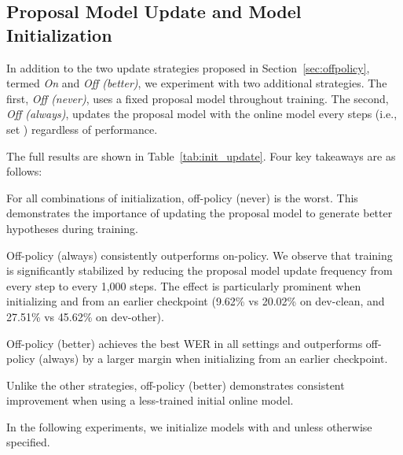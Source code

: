 \subsection{Proposal Model Update and Model Initialization}\label{sec:res_init_prop}

In addition to the two update strategies proposed in Section~\ref{sec:offpolicy}, termed \emph{On} and \emph{Off (better)}, we experiment with two additional strategies.
The first, \emph{Off (never)}, uses a fixed proposal model throughout training.
The second, \emph{Off (always)}, updates the proposal model with the online model every  steps (i.e., set ) regardless of performance.

The full results are shown in Table~\ref{tab:init_update}. 
Four key takeaways are as follows:
\begin{enumerate*}[label=(\arabic*)]
    \item For all combinations of  initialization, off-policy (never) is the worst. This demonstrates the importance of updating the proposal model to generate better hypotheses during training.
    
    \item Off-policy (always) consistently outperforms on-policy. We observe that training is significantly stabilized by reducing the proposal model update frequency from every step to every 1,000 steps.
    The effect is particularly prominent when initializing  and  from an earlier checkpoint (9.62\% vs 20.02\% on dev-clean, and 27.51\% vs 45.62\% on dev-other).
    
    \item Off-policy (better) achieves the best WER in all settings and outperforms off-policy (always) by a larger margin when initializing from an earlier checkpoint.
    
    \item Unlike the other strategies, off-policy (better) demonstrates consistent improvement when using a less-trained initial online model.
\end{enumerate*}
In the following experiments, we initialize models with  and  unless otherwise specified.

